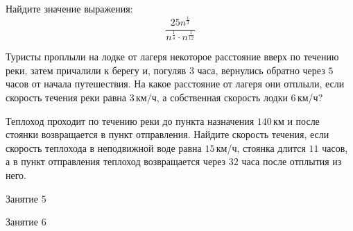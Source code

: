 \begin{homework}[number=2]
	\begin{listofex}
		\item Найдите значение выражения: \[ \dfrac{25n^{\frac{1}{3}}}{n^{\frac{1}{4}}\cdot n^{\frac{1}{12}}} \]
		\item Туристы проплыли на лодке от лагеря некоторое расстояние вверх по течению реки, затем причалили к берегу и, погуляв \( 3 \) часа, вернулись обратно через \( 5 \) часов от начала путешествия. На какое расстояние от лагеря они отплыли, если скорость течения реки равна \( 3 \) км/ч, а собственная скорость лодки \( 6 \) км/ч?
		\item Теплоход проходит по течению реки до пункта назначения \( 140 \) км и после стоянки возвращается в пункт отправления. Найдите скорость течения, если скорость теплохода в неподвижной воде равна \( 15 \) км/ч, стоянка длится \( 11 \) часов, а в пункт отправления теплоход возвращается через \( 32 \) часа после отплытия из него.
	\end{listofex}
\end{homework}

\begin{class}[number=5]
	\begin{listofex}
		\item Занятие 5
	\end{listofex}
\end{class}

\begin{class}[number=6]
	\begin{listofex}
		\item Занятие 6
	\end{listofex}
\end{class}


